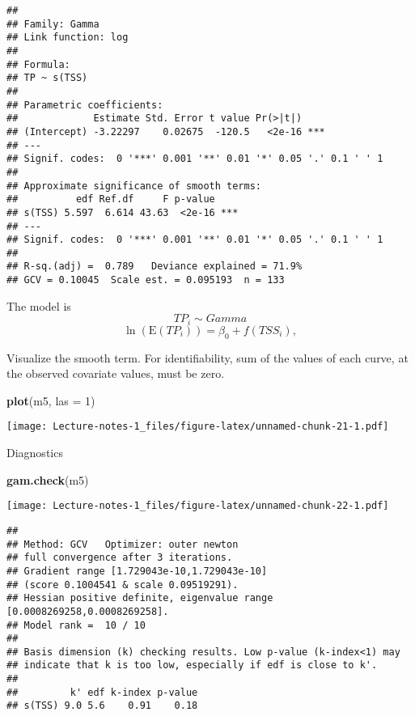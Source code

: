 \documentclass[
]{book}
\newenvironment{Shaded}{\begin{snugshade}}{\end{snugshade}}
\newcommand{\DataTypeTok}[1]{\textcolor[rgb]{0.13,0.29,0.53}{#1}}
\newcommand{\DecValTok}[1]{\textcolor[rgb]{0.00,0.00,0.81}{#1}}
\newcommand{\KeywordTok}[1]{\textcolor[rgb]{0.13,0.29,0.53}{\textbf{#1}}}
\newcommand{\NormalTok}[1]{#1}
\begin{document}
\begin{verbatim}
## 
## Family: Gamma 
## Link function: log 
## 
## Formula:
## TP ~ s(TSS)
## 
## Parametric coefficients:
##             Estimate Std. Error t value Pr(>|t|)    
## (Intercept) -3.22297    0.02675  -120.5   <2e-16 ***
## ---
## Signif. codes:  0 '***' 0.001 '**' 0.01 '*' 0.05 '.' 0.1 ' ' 1
## 
## Approximate significance of smooth terms:
##          edf Ref.df     F p-value    
## s(TSS) 5.597  6.614 43.63  <2e-16 ***
## ---
## Signif. codes:  0 '***' 0.001 '**' 0.01 '*' 0.05 '.' 0.1 ' ' 1
## 
## R-sq.(adj) =  0.789   Deviance explained = 71.9%
## GCV = 0.10045  Scale est. = 0.095193  n = 133
\end{verbatim}

The model is
\[TP_i \sim Gamma\]
\[\ln(\text{E}(TP_i)) = \beta_0 + f(TSS_i),\]

Visualize the smooth term. For identifiability, sum of the values of each curve, at the observed covariate values, must be zero.

\begin{Shaded}
\begin{Highlighting}[]
\KeywordTok{plot}\NormalTok{(m5, }\DataTypeTok{las =} \DecValTok{1}\NormalTok{)}
\end{Highlighting}
\end{Shaded}

\texttt{[image: Lecture-notes-1\_files/figure-latex/unnamed-chunk-21-1.pdf]}

Diagnostics

\begin{Shaded}
\begin{Highlighting}[]
\KeywordTok{gam.check}\NormalTok{(m5)}
\end{Highlighting}
\end{Shaded}

\texttt{[image: Lecture-notes-1\_files/figure-latex/unnamed-chunk-22-1.pdf]}

\begin{verbatim}
## 
## Method: GCV   Optimizer: outer newton
## full convergence after 3 iterations.
## Gradient range [1.729043e-10,1.729043e-10]
## (score 0.1004541 & scale 0.09519291).
## Hessian positive definite, eigenvalue range [0.0008269258,0.0008269258].
## Model rank =  10 / 10 
## 
## Basis dimension (k) checking results. Low p-value (k-index<1) may
## indicate that k is too low, especially if edf is close to k'.
## 
##         k' edf k-index p-value
## s(TSS) 9.0 5.6    0.91    0.18
\end{verbatim}
\end{document}
